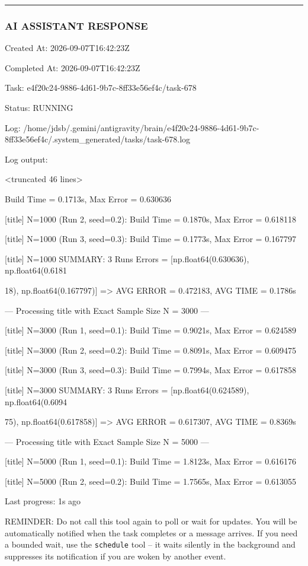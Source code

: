 \documentclass[11pt,a4paper]{article}
\begin{document}
\hrule

\subsubsection{AI ASSISTANT RESPONSE}

Created At: 2026-09-07T16:42:23Z

Completed At: 2026-09-07T16:42:23Z

Task: e4f20c24-9886-4d61-9b7c-8ff33e56ef4c/task-678

Status: RUNNING

Log: /home/jdsb/.gemini/antigravity/brain/e4f20c24-9886-4d61-9b7c-8ff33e56ef4c/.system\_generated/tasks/task-678.log

Log output:

<truncated 46 lines>

Build Time = 0.1713s, Max Error = 0.630636

[title] N=1000 (Run 2, seed=0.2): Build Time = 0.1870s, Max Error = 0.618118

[title] N=1000 (Run 3, seed=0.3): Build Time = 0.1773s, Max Error = 0.167797

[title] N=1000 SUMMARY: 3 Runs Errors = [np.float64(0.630636), np.float64(0.6181

18), np.float64(0.167797)] => AVG ERROR = 0.472183, AVG TIME = 0.1786s

--- Processing title with Exact Sample Size N = 3000 ---

[title] N=3000 (Run 1, seed=0.1): Build Time = 0.9021s, Max Error = 0.624589

[title] N=3000 (Run 2, seed=0.2): Build Time = 0.8091s, Max Error = 0.609475

[title] N=3000 (Run 3, seed=0.3): Build Time = 0.7994s, Max Error = 0.617858

[title] N=3000 SUMMARY: 3 Runs Errors = [np.float64(0.624589), np.float64(0.6094

75), np.float64(0.617858)] => AVG ERROR = 0.617307, AVG TIME = 0.8369s

--- Processing title with Exact Sample Size N = 5000 ---

[title] N=5000 (Run 1, seed=0.1): Build Time = 1.8123s, Max Error = 0.616176

[title] N=5000 (Run 2, seed=0.2): Build Time = 1.7565s, Max Error = 0.613055


Last progress: 1s ago



REMINDER: Do not call this tool again to poll or wait for updates. You will be automatically notified when the task completes or a message arrives. If you need a bounded wait, use the \texttt{schedule} tool -- it waits silently in the background and suppresses its notification if you are woken by another event.
\end{document}
